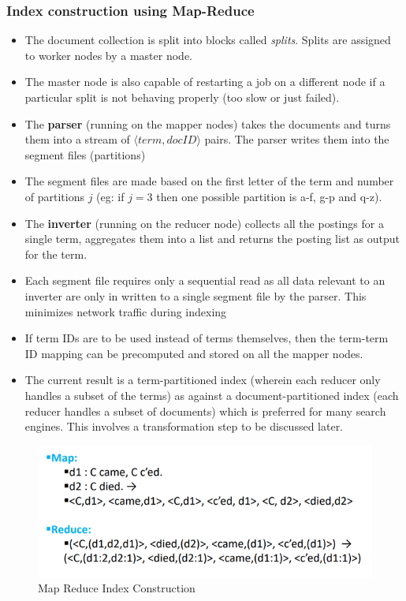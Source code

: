 \documentclass{article}
\begin{document}
\subsubsection{Index construction using Map-Reduce}
\begin{itemize}
    \item The document collection is split into blocks called \textit{splits}. Splits are assigned to worker nodes by a master node. 
    
    \item The master node is also capable of restarting a job on a different node if a particular split is not behaving properly (too slow or just failed). 
    
    \item The \textbf{parser} (running on the mapper nodes) takes the documents and turns them into a stream of $\langle term, docID \rangle$ pairs. The parser writes them into the segment files (partitions)
    
    \item The segment files are made based on the first letter of the term and number of partitions $j$ (eg: if $j=3$ then one possible partition is a-f, g-p and q-z). 
    
    \item The \textbf{inverter} (running on the reducer node) collects all the postings for a single term, aggregates them into a list and returns the posting list as output for the term. 
    
    \item Each segment file requires only a sequential read as all data relevant to an inverter are only in written to a single segment file by the parser. This minimizes network traffic during indexing
    
    \item If term IDs are to be used instead of terms themselves, then the term-term ID mapping can be precomputed and stored on all the mapper nodes. 
    
    \item The current result is a term-partitioned index (wherein each reducer only handles a subset of the terms) as against a document-partitioned index (each reducer handles a subset of documents) which is preferred for many search engines. This involves a transformation step to be discussed later.  
\end{itemize}

\begin{figure}[!h]
    \centering
    \includegraphics[scale=0.7]{img1.png}
    \caption{Map Reduce Index Construction}
    \label{fig:my_label}
\end{figure}
\end{document}
